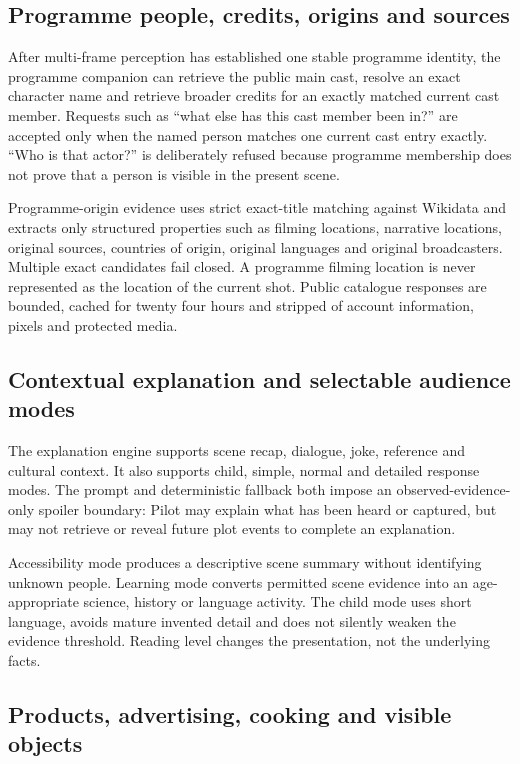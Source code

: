 \subsection{Programme people, credits, origins and sources}

After multi-frame perception has established one stable programme identity, the programme
companion can retrieve the public main cast, resolve an exact character name and retrieve
broader credits for an exactly matched current cast member.  Requests such as ``what else
has this cast member been in?'' are accepted only when the named person matches one current
cast entry exactly.  ``Who is that actor?'' is deliberately refused because programme
membership does not prove that a person is visible in the present scene.

Programme-origin evidence uses strict exact-title matching against Wikidata and extracts
only structured properties such as filming locations, narrative locations, original
sources, countries of origin, original languages and original broadcasters.  Multiple
exact candidates fail closed.  A programme filming location is never represented as the
location of the current shot.  Public catalogue responses are bounded, cached for twenty
four hours and stripped of account information, pixels and protected media.

\subsection{Contextual explanation and selectable audience modes}

The explanation engine supports scene recap, dialogue, joke, reference and cultural
context.  It also supports child, simple, normal and detailed response modes.  The prompt
and deterministic fallback both impose an observed-evidence-only spoiler boundary: Pilot
may explain what has been heard or captured, but may not retrieve or reveal future plot
events to complete an explanation.

Accessibility mode produces a descriptive scene summary without identifying unknown
people.  Learning mode converts permitted scene evidence into an age-appropriate science,
history or language activity.  The child mode uses short language, avoids mature invented
detail and does not silently weaken the evidence threshold.  Reading level changes the
presentation, not the underlying facts.

\subsection{Products, advertising, cooking and visible objects}


